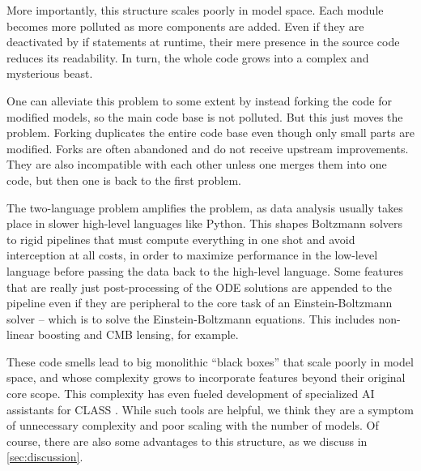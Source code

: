 \documentclass{aa}
\begin{document}
More importantly, this structure scales poorly in model space.
Each module becomes more polluted as more components are added.
Even if they are deactivated by if statements at runtime, their mere presence in the source code reduces its readability.
In turn, the whole code grows into a complex and mysterious beast.

One can alleviate this problem to some extent by instead forking the code for modified models, so the main code base is not polluted.
But this just moves the problem.
Forking duplicates the entire code base even though only small parts are modified.
Forks are often abandoned and do not receive upstream improvements.
They are also incompatible with each other unless one merges them into one code, but then one is back to the first problem.

The two-language problem amplifies the problem, as data analysis usually takes place in slower high-level languages like Python.
This shapes Boltzmann solvers to rigid pipelines that must compute everything in one shot and avoid interception at all costs, in order to maximize performance in the low-level language before passing the data back to the high-level language.
Some features that are really just post-processing of the ODE solutions are appended to the pipeline even if they are peripheral to the core task of an Einstein-Boltzmann solver -- which is to solve the Einstein-Boltzmann equations.
This includes non-linear boosting and CMB lensing, for example.

These code smells lead to big monolithic \enquote{black boxes} that scale poorly in model space, and whose complexity grows to incorporate features beyond their original core scope.
This complexity has even fueled development of specialized AI assistants for CLASS \citep{casasCLAPPCLASSLLM2025}.
While such tools are helpful, we think they are a symptom of unnecessary complexity and poor scaling with the number of models.
Of course, there are also some advantages to this structure, as we discuss in \cref{sec:discussion}.

\iffalse
One design is not necessarily better than the other.
Monolithic pros: freedom to do anything (e.g. approximations, switching, ...); 
Monolithic cons: does not scale well for many models, must navigate huge source code, not transparent; low level of abstraction; 
Modular pros: higher level of abstraction; unused components do not clutter; which equations are transparent to the user.
Modular cons: monolithic pros.
In my opinion, this makes CLASS good for a fine-tuned fiducial cosmology code,
while SymBoltz provides a platform that makes it easier to "explore" additional models (i.e. a "general purpose Boltzmann solver"),
in our opinion.
\fi
\end{document}
